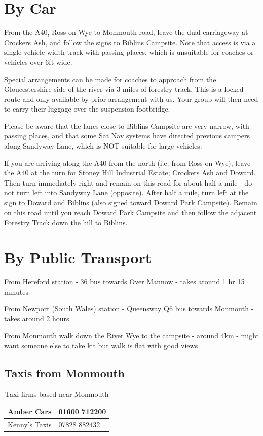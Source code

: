 \documentclass[a4paper, 11pt]{report}
\newcommand{\nl}{\newline}
\begin{document}
\section{By Car}
From the A40, Ross-on-Wye to Monmouth road, leave the dual carriageway at Crockers Ash, and follow the signs to Biblins Campsite. Note that access is via a single vehicle width track with passing places, which is unsuitable for coaches or vehicles over 6ft wide.\nl

Special arrangements can be made for coaches to approach from the Gloucestershire side of the river via 3 miles of forestry track. This is a locked route and only available by prior arrangement with us. Your group will then need to carry their luggage over the suspension footbridge.\nl

Please be aware that the lanes close to Biblins Campsite are very narrow, with passing places, and that some Sat Nav systems have directed previous campers along Sandyway Lane, which is NOT suitable for large vehicles.\nl

If you are arriving along the A40 from the north (i.e. from Ross-on-Wye), leave the A40 at the turn for Stoney Hill Industrial Estate; Crockers Ash and Doward. Then turn immediately right and remain on this road for about half a mile - do not turn left into Sandyway Lane (opposite). After half a mile, turn left at the sign to Doward and Biblins (also signed toward Doward Park Campsite). Remain on this road until you reach Doward Park Campsite and then follow the adjacent Forestry Track down the hill to Biblins.\nl

\section{By Public Transport}
From Hereford station - 36 bus towards Over Mannow - takes around 1 hr 15 minutes\nl

From Newport (South Wales) station - Queensway Q6 bus towards Monmouth - takes around 2 hours\nl

From Monmouth walk down the River Wye to the campsite - around 4km - might want someone else to take kit but walk is flat with good views\nl

\subsection{Taxis from Monmouth}
\begin{table}[H]
    \centering
    \begin{tabular}{p{} p{}}
        \hline
        Amber Cars & 01600 712200\\
        \hline
        Kenny's Taxis & 07828 882432\\
        \hline
    \end{tabular}
    \caption{Taxi firms based near Monmouth}
\end{table}
\end{document}
